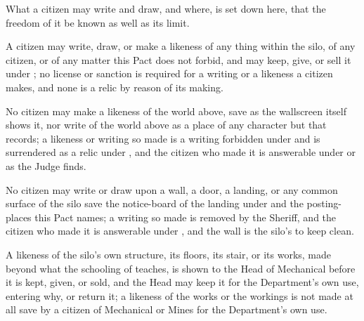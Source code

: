 What a citizen may write and draw, and where, is set down here, that the freedom of it be known as well as its limit.

\begin{clauses}
\item A citizen may write, draw, or make a likeness of any thing within the silo, of any citizen, or of any matter this Pact does not forbid, and may keep, give, or sell it under ; no license or sanction is required for a writing or a likeness a citizen makes, and none is a relic by reason of its making.
\item No citizen may make a likeness of the world above, save as the wallscreen itself shows it, nor write of the world above as a place of any character but that  records; a likeness or writing so made is a writing forbidden under  and is surrendered as a relic under , and the citizen who made it is answerable under  or  as the Judge finds.
\item No citizen may write or draw upon a wall, a door, a landing, or any common surface of the silo save the notice-board of the landing under  and the posting-places this Pact names; a writing so made is removed by the Sheriff, and the citizen who made it is answerable under , and the wall is the silo's to keep clean.
\item A likeness of the silo's own structure, its floors, its stair, or its works, made beyond what the schooling of  teaches, is shown to the Head of Mechanical before it is kept, given, or sold, and the Head may keep it for the Department's own use, entering why, or return it; a likeness of the works or the workings is not made at all save by a citizen of Mechanical or Mines for the Department's own use.
\end{clauses}
